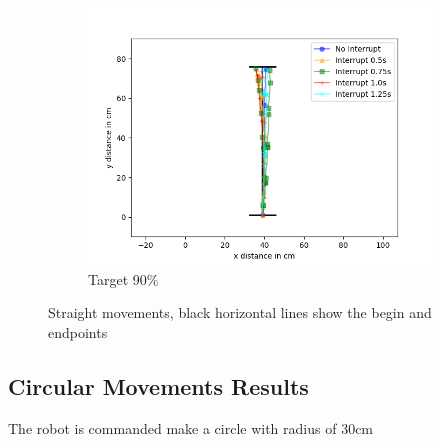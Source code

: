 \begin{figure}
\begin{subfigure}[b]{0.62\textwidth}
		\includegraphics[width=\textwidth]{pics/straight_90.png}
		\caption{Target 90\%}
		\label{fig:stra_exp3}
	\end{subfigure}
	\caption{Straight movements, black horizontal lines show the begin and endpoints}
\end{figure}


\subsection{Circular Movements Results}

The robot is commanded make a circle with radius of 30cm


